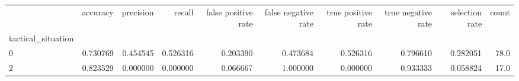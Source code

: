 \begin{tabular}{lrrrrrrrrr}
\toprule
{} &  accuracy &  precision &    recall &  false positive rate &  false negative rate &  true positive rate &  true negative rate &  selection rate &  count \\
tactical\_situation &           &            &           &                      &                      &                     &                     &                 &        \\
\midrule
0                  &  0.730769 &   0.454545 &  0.526316 &             0.203390 &             0.473684 &            0.526316 &            0.796610 &        0.282051 &   78.0 \\
2                  &  0.823529 &   0.000000 &  0.000000 &             0.066667 &             1.000000 &            0.000000 &            0.933333 &        0.058824 &   17.0 \\
\bottomrule
\end{tabular}

